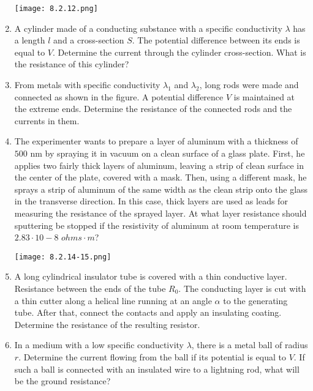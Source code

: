 \documentclass{article}
\begin{document}
\begin{enumerate}[label=8.2.\arabic*]
\begin{center}
    \texttt{[image: 8.2.12.png]}
\end{center}


\item A cylinder made of a conducting substance with a specific conductivity $\lambda$ has a length $l$ and a cross-section $S$. The potential difference between its ends is equal to $V$. Determine the current through the cylinder cross-section. What is the resistance of this cylinder?

\item From metals with specific conductivity $\lambda_1$ and $\lambda_2$, long rods were made and connected as shown in the figure. A potential difference $V$ is maintained at the extreme ends. Determine the resistance of the connected rods and the currents in them.

\item The experimenter wants to prepare a layer of aluminum with a thickness of $500$ nm by spraying it in vacuum on a clean surface of a glass plate. First, he applies two fairly thick layers of aluminum, leaving a strip of clean surface in the center of the plate, covered with a mask. Then, using a different mask, he sprays a strip of aluminum of the same width as the clean strip onto the glass in the transverse direction. In this case, thick layers are used as leads for measuring the resistance of the sprayed layer. At what layer resistance should sputtering be stopped if the resistivity of aluminum at room temperature is $2.83 \cdot 10-8$ $ohms \cdot m$?

\begin{center}
    \texttt{[image: 8.2.14-15.png]}
\end{center}

\item A long cylindrical insulator tube is covered with a thin conductive layer. Resistance between the ends of the tube $R_0$. The conducting layer is cut with a thin cutter along a helical line running at an angle $\alpha$ to the generating tube. After that, connect the contacts and apply an insulating coating. Determine the resistance of the resulting resistor.

\item In a medium with a low specific conductivity $\lambda$, there is a metal ball of radius $r$. Determine the current flowing from the ball if its potential is equal to $V$. If such a ball is connected with an insulated wire to a lightning rod, what will be the ground resistance?


\end{enumerate}
\end{document}
